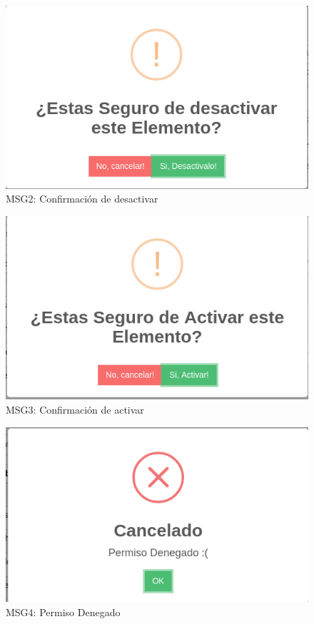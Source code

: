 \begin{figure}[htbp!]
	\begin{center}
		\includegraphics[width=\textwidth]{Pantallas/ConfirmacionDesactivar}
		\caption{MSG2: Confirmación de desactivar}
	\end{center}
\end{figure}

\begin{figure}[htbp!]
	\begin{center}
		\includegraphics[width=\textwidth]{Pantallas/ConfirmacionActivar}
		\caption{MSG3: Confirmación de activar}
	\end{center}
\end{figure}

\begin{figure}[htbp!]
	\begin{center}
		\includegraphics[width=\textwidth]{Pantallas/PermisoDenegado}
		\caption{MSG4: Permiso Denegado}
	\end{center}
\end{figure}


